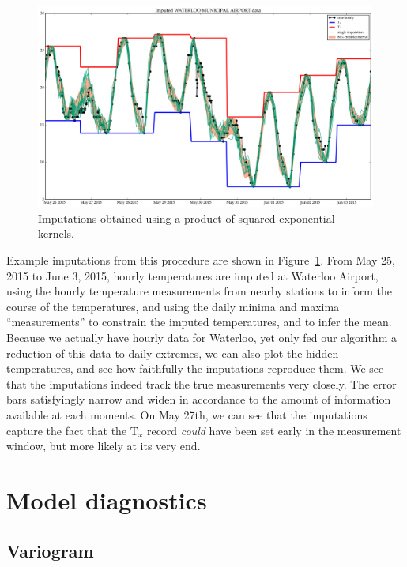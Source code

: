 \documentclass[letter]{article}
\makeatletter
\def\maxwidth{\ifdim\Gin@nat@width>\linewidth\linewidth
\else\Gin@nat@width\fi}
\let\Oldincludegraphics\includegraphics
\renewcommand{\includegraphics}[1]{\Oldincludegraphics[width=.8\maxwidth]{#1}}
\newcommand{\T}{\mathrm{T}}
\newcommand{\Tx}{\T_{x}}
\makeatother
\begin{document}
        \begin{figure}
\centering
\includegraphics{figures/imputations_SEonly.png}
\caption{\label{fig:imputations_SEonly}
Imputations obtained using a product of squared exponential kernels.}
\end{figure}

Example imputations from this procedure are shown in Figure~\ref{fig:imputations_SEonly}.
From May 25, 2015 to June 3, 2015, hourly temperatures are imputed at Waterloo Airport, using the hourly temperature measurements from nearby stations to inform the course of the temperatures, and using the daily minima and maxima ``measurements'' to constrain the imputed temperatures, and to infer the mean.
Because we actually have hourly data for Waterloo, yet only fed our algorithm a reduction of this data to daily extremes, we can also plot the hidden temperatures, and see how faithfully the imputations reproduce them.
We see that the imputations indeed track the true measurements very closely.
The error bars satisfyingly narrow and widen in accordance to the amount of information available at each moments.
On May 27th, we can see that the imputations capture the fact that the \(\Tx\) record \emph{could} have been set early in the measurement window, but more likely at its very end.
    


        \section{Model diagnostics}\label{model-diagnostics}

\subsection{Variogram}\label{variogram}
\end{document}
